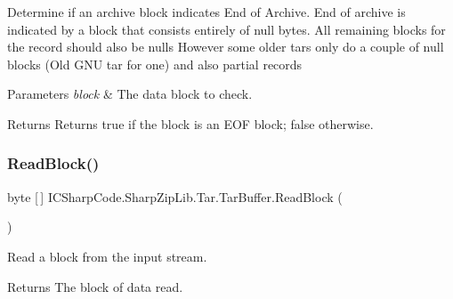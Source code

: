 Determine if an archive block indicates End of Archive. End of archive is indicated by a block that consists entirely of null bytes. All remaining blocks for the record should also be null\textquotesingle{}s However some older tars only do a couple of null blocks (Old G\+NU tar for one) and also partial records 


\begin{DoxyParams}{Parameters}
{\em block} & The data block to check.\\
\hline
\end{DoxyParams}
\begin{DoxyReturn}{Returns}
Returns true if the block is an E\+OF block; false otherwise.
\end{DoxyReturn}
\mbox{\label{class_i_c_sharp_code_1_1_sharp_zip_lib_1_1_tar_1_1_tar_buffer_a401cc4e6bb1efe7f710101ee1032586e}} 
\subsubsection{\texorpdfstring{Read\+Block()}{ReadBlock()}}
{\footnotesize\ttfamily byte \mbox{[}$\,$\mbox{]} I\+C\+Sharp\+Code.\+Sharp\+Zip\+Lib.\+Tar.\+Tar\+Buffer.\+Read\+Block (\begin{DoxyParamCaption}{ }\end{DoxyParamCaption})\hspace{0.3cm}{\ttfamily [inline]}}



Read a block from the input stream. 

\begin{DoxyReturn}{Returns}
The block of data read. 
\end{DoxyReturn}
\mbox{\label{class_i_c_sharp_code_1_1_sharp_zip_lib_1_1_tar_1_1_tar_buffer_ab6bab34e56056d8ee5890246edb56e8c}} 
